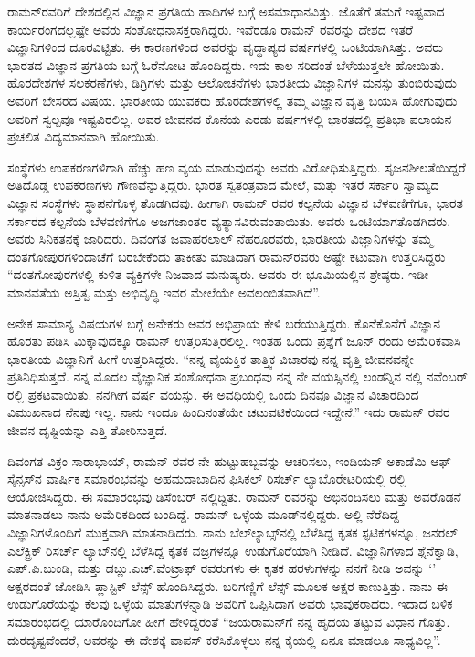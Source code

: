 
ರಾಮನ್‍ರವರಿಗೆ ದೇಶದಲ್ಲಿನ ವಿಜ್ಞಾನ ಪ್ರಗತಿಯ ಹಾದಿಗಳ ಬಗ್ಗೆ ಅಸಮಾಧಾನವಿತ್ತು. ಜೊತೆಗೆ ತಮಗೆ ಇಷ್ಟವಾದ ಕಾರ್ಯರಂಗದಲ್ಲಷ್ಟೇ ಅವರು ಸಂಶೋಧನಾಸಕ್ತರಾಗಿದ್ದರು. ಇವೆರಡೂ ರಾಮನ್ ರವರನ್ನು ದೇಶದ ಇತರೆ ವಿಜ್ಞಾನಿಗಳಿಂದ ದೂರವಿಟ್ಟಿತು. ಈ ಕಾರಣಗಳಿಂದ ಅವರನ್ನು ವೃದ್ಧಾಪ್ಯದ ವರ್ಷಗಳಲ್ಲಿ ಒಂಟಿಯಾಗಿಸಿತ್ತು. ಅವರು ಭಾರತದ ವಿಜ್ಞಾನ ಪ್ರಗತಿಯ ಬಗ್ಗೆ ಓರೆನೋಟ ಹೊಂದಿದ್ದರು. ಇದು ಕಾಲ ಸರಿದಂತೆ ಬೆಳೆಯುತ್ತಲೇ ಹೋಯಿತು. ಹೊರದೇಶಗಳ ಸಲಕರಣೆಗಳು, ಡಿಗ್ರಿಗಳು ಮತ್ತು ಆಲೋಚನೆಗಳು ಭಾರತೀಯ ವಿಜ್ಞಾನಿಗಳ ಮನಸ್ಸು ತುಂಬಿರುವುದು ಅವರಿಗೆ ಬೇಸರದ ವಿಷಯ. ಭಾರತೀಯ ಯುವಕರು ಹೊರದೇಶಗಳಲ್ಲಿ ತಮ್ಮ ವಿಜ್ಞಾನ ವೃತ್ತಿ ಬಯಸಿ ಹೋಗುವುದು ಅವರಿಗೆ ಸ್ವಲ್ಪವೂ ಇಷ್ಟವಿರಲಿಲ್ಲ. ಅವರ ಜೀವನದ ಕೊನೆಯ ಎರಡು ವರ್ಷಗಳಲ್ಲಿ ಭಾರತದಲ್ಲಿ ಪ್ರತಿಭಾ ಪಲಾಯನ ಪ್ರಚಲಿತ ವಿದ್ಯಮಾನವಾಗಿ ಹೋಯಿತು.

ಸಂಸ್ಥೆಗಳು ಉಪಕರಣಗಳಿಗಾಗಿ ಹೆಚ್ಚು ಹಣ ವ್ಯಯ ಮಾಡುವುದನ್ನು ಅವರು ವಿರೋಧಿಸುತ್ತಿದ್ದರು. ಸೃಜನಶೀಲತೆಯಿದ್ದರೆ ಅತಿದೊಡ್ಡ ಉಪಕರಣಗಳು ಗೌಣವೆನ್ನುತ್ತಿದ್ದರು. ಭಾರತ ಸ್ವತಂತ್ರವಾದ ಮೇಲೆ,  ಮತ್ತು ಇತರೆ ಸರ್ಕಾರಿ ಸ್ವಾಮ್ಯದ ವಿಜ್ಞಾನ ಸಂಸ್ಥೆಗಳು ಸ್ಥಾಪನೆಗೊಳ್ಳ ತೊಡಗಿದವು. ಹೀಗಾಗಿ ರಾಮನ್ ರವರ ಕಲ್ಪನೆಯ ವಿಜ್ಞಾನ ಬೆಳವಣಿಗೆಗೂ, ಭಾರತ ಸರ್ಕಾರದ ಕಲ್ಪನೆಯ ಬೆಳವಣಿಗೆಗೂ ಅಜಗಜಾಂತರ ವ್ಯತ್ಯಾಸವಿರುವಂತಾಯಿತು. ಅವರು ಒಂಟಿಯಾಗತೊಡಗಿದರು. ಅವರು ಸಿನಿಕತನಕ್ಕೆ ಜಾರಿದರು. ದಿವಂಗತ ಜವಾಹರಲಾಲ್ ನೆಹರೂರವರು, ಭಾರತೀಯ ವಿಜ್ಞಾನಿಗಳನ್ನು ತಮ್ಮ ದಂತಗೋಪುರಗಳಿಂದಾಚೆಗೆ ಬರಬೇಕೆಂದು ತಾಕೀತು ಮಾಡಿದಾಗ ರಾಮನ್‍ರವರು ಅಷ್ಟೇ ಕಟುವಾಗಿ ಉತ್ತರಿಸಿದ್ದರು \enginline{-} “ದಂತಗೋಪುರಗಳಲ್ಲಿ ಕುಳಿತ ವ್ಯಕ್ತಿಗಳೇ ನಿಜವಾದ ಮನುಷ್ಯರು. ಅವರು ಈ ಭೂಮಿಯಲ್ಲಿನ ಶ್ರೇಷ್ಠರು. ಇಡೀ ಮಾನವತೆಯ ಅಸ್ತಿತ್ವ ಮತ್ತು ಅಭಿವೃದ್ಧಿ ಇವರ ಮೇಲೆಯೇ ಅವಲಂಬಿತವಾಗಿದೆ”.

ಅನೇಕ ಸಾಮಾನ್ಯ ವಿಷಯಗಳ ಬಗ್ಗೆ ಅನೇಕರು ಅವರ ಅಭಿಪ್ರಾಯ ಕೇಳಿ ಬರೆಯುತ್ತಿದ್ದರು. ಕೊನೆಕೊನೆಗೆ ವಿಜ್ಞಾನ ಹೊರತು ಪಡಿಸಿ ಮಿಕ್ಕಾವುದಕ್ಕೂ ರಾಮನ್ ಉತ್ತರಿಸುತ್ತಿರಲಿಲ್ಲ. ಇಂತಹ ಒಂದು ಪ್ರಶ್ನೆಗೆ ಜೂನ್  ರಂದು ಅಮೆರಿಕವಾಸಿ ಭಾರತೀಯ ವಿಜ್ಞಾನಿಗೆ ಹೀಗೆ ಉತ್ತರಿಸಿದ್ದರು.\enginline{-} “ನನ್ನ ವೈಯಕ್ತಿಕ ತಾತ್ತ್ವಿಕ ವಿಚಾರವು ನನ್ನ ವೃತ್ತಿ ಜೀವನವನ್ನೇ ಪ್ರತಿನಿಧಿಸುತ್ತದೆ. ನನ್ನ ಮೊದಲ ವೈಜ್ಞಾನಿಕ ಸಂಶೋಧನಾ ಪ್ರಬಂಧವು ನನ್ನ ನೇ ವಯಸ್ಸಿನಲ್ಲಿ ಲಂಡನ್ನಿನ \textit{} ನಲ್ಲಿ ನವೆಂಬರ್ ರಲ್ಲಿ ಪ್ರಕಟವಾಯಿತು. ನನಗೀಗ  ವರ್ಷ ವಯಸ್ಸು. ಈ ಅವಧಿಯಲ್ಲಿ ಒಂದು ದಿನವೂ ವಿಜ್ಞಾನ ವಿಚಾರದಿಂದ ವಿಮುಖನಾದ ನೆನಪು ಇಲ್ಲ. ನಾನು ಇಂದೂ ಹಿಂದಿನಂತೆಯೇ ಚಟುವಟಿಕೆಯಿಂದ ಇದ್ದೇನೆ.” ಇದು ರಾಮನ್ ರವರ ಜೀವನ ದೃಷ್ಟಿಯನ್ನು ಎತ್ತಿ ತೋರಿಸುತ್ತದೆ.

ದಿವಂಗತ ವಿಕ್ರಂ ಸಾರಾಭಾಯ್, ರಾಮನ್ ರವರ ನೇ ಹುಟ್ಟುಹಬ್ಬವನ್ನು ಆಚರಿಸಲು, ಇಂಡಿಯನ್ ಅಕಾಡೆಮಿ ಆಫ್ ಸೈನ್ಸಸ್‍ನ ವಾರ್ಷಿಕ ಸಮಾರಂಭವನ್ನು ಅಹಮದಾಬಾದಿನ ಫಿಸಿಕಲ್ ರಿಸರ್ಚ್ ಲ್ಯಾಬೊರೇಟರಿಯಲ್ಲಿ ರಲ್ಲಿ ಆಯೋಜಿಸಿದ್ದರು. ಈ ಸಮಾರಂಭವು ಡಿಸೆಂಬರ್ ನಲ್ಲಿದ್ದಿತು. ರಾಮನ್ ರವರನ್ನು ಅಭಿನಂದಿಸಲು ಮತ್ತು ಅವರೊಡನೆ ಮಾತನಾಡಲು ನಾನು ಅಮೆರಿಕದಿಂದ ಬಂದಿದ್ದೆ. ರಾಮನ್ ಒಳ್ಳೆಯ ಮೂಡ್‍ನಲ್ಲಿದ್ದರು. ಅಲ್ಲಿ ನೆರೆದಿದ್ದ ವಿಜ್ಞಾನಿಗಳೊಂದಿಗೆ ಮುಕ್ತವಾಗಿ ಮಾತನಾಡಿದರು. ನಾನು ಬೆಲ್‍ಲ್ಯಾಬ್ಸ್‌ನಲ್ಲಿ ಬೆಳೆಸಿದ್ದ ಕೃತಕ ಸ್ಫಟಿಕಗಳನ್ನೂ, ಜನರಲ್ ಎಲೆಕ್ಟ್ರಿಕ್ ರಿಸರ್ಚ್ ಲ್ಯಾಬ್‍ನಲ್ಲಿ ಬೆಳೆಸಿದ್ದ ಕೃತಕ ವಜ್ರಗಳನ್ನೂ ಉಡುಗೊರೆಯಾಗಿ ನೀಡಿದೆ. ವಿಜ್ಞಾನಿಗಳಾದ ಶ್ನೆನೆಕ್ವಾಡಿ, ಎಪ್.ಪಿ.ಬುಂಡಿ, ಮತ್ತು ಡಬ್ಲು.ಎಚ್.ವೆಂಟ್ರಾಫ್ ರವರುಗಳು ಈ ಕೃತಕ ಹರಳುಗಳನ್ನು ನನಗೆ ನೀಡಿ ಅವನ್ನು ‘’ ಅಕ್ಷರದಂತೆ ಜೋಡಿಸಿ ಪ್ಲಾಸ್ಟಿಕ್ ಲೆನ್ಸ್ ಹೊಂದಿಸಿದ್ದರು. ಬರಿಗಣ್ಣಿಗೆ ಲೆನ್ಸ್ ಮೂಲಕ ಅಕ್ಷರ ಕಾಣುತ್ತಿತ್ತು. ನಾನು ಈ ಉಡುಗೊರೆಯನ್ನು ಕೆಲವು ಒಳ್ಳೆಯ ಮಾತುಗಳನ್ನಾಡಿ ಅವರಿಗೆ ಒಪ್ಪಿಸಿದಾಗ ಅವರು ಭಾವುಕರಾದರು. ಇದಾದ ಬಳಿಕ ಸಮಾರಂಭದಲ್ಲಿ ಯಾರೊಂದಿಗೋ ಹೀಗೆ ಹೇಳಿದ್ದರಂತೆ\enginline{-} “ಜಯರಾಮನ್‍ಗೆ ನನ್ನ ಹೃದಯ ತಟ್ಟುವ ವಿಧಾನ ಗೊತ್ತು. ದುರದೃಷ್ಟವೆಂದರೆ, ಅವರನ್ನು ಈ ದೇಶಕ್ಕೆ ವಾಪಸ್ ಕರೆಸಿಕೊಳ್ಳಲು ನನ್ನ ಕೈಯಲ್ಲಿ ಏನೂ ಮಾಡಲೂ ಸಾಧ್ಯವಿಲ್ಲ”.

